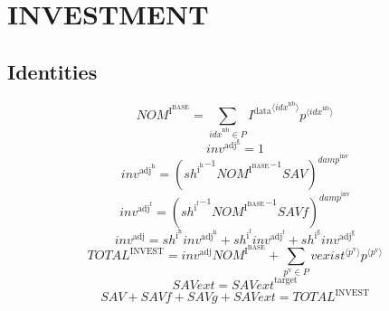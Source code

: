 \section{INVESTMENT}

\subsection{Identities}

\begin{equation}
{N\!O\!M}^{\mathrm{I}^{\mathrm{BASE}}} = \sum_{{i\!d\!x}^{\mathrm{nb}}\in P} {{I^{\mathrm{data}}}^{\langle {i\!d\!x}^{\mathrm{nb}}\rangle}} {{p}^{\langle {i\!d\!x}^{\mathrm{nb}}\rangle}}
\end{equation}
\begin{equation}
{i\!n\!v}^{\mathrm{adj}^{\mathrm{g}}} = 1
\end{equation}
\begin{equation}
{i\!n\!v}^{\mathrm{adj}^{\mathrm{h}}} = \left({{s\!h}^{\mathrm{i}^{\mathrm{h}}}}^{-1} {{N\!O\!M}^{\mathrm{I}^{\mathrm{BASE}}}}^{-1} {{S\!A\!V}}\right)^{{d\!a\!m\!p}^{\mathrm{inv}}}
\end{equation}
\begin{equation}
{i\!n\!v}^{\mathrm{adj}^{\mathrm{f}}} = \left({{s\!h}^{\mathrm{i}^{\mathrm{f}}}}^{-1} {{N\!O\!M}^{\mathrm{I}^{\mathrm{BASE}}}}^{-1} {{S\!A\!V\!f}}\right)^{{d\!a\!m\!p}^{\mathrm{inv}}}
\end{equation}
\begin{equation}
{i\!n\!v}^{\mathrm{adj}} = {{s\!h}^{\mathrm{i}^{\mathrm{h}}}} {{i\!n\!v}^{\mathrm{adj}^{\mathrm{h}}}} + {{s\!h}^{\mathrm{i}^{\mathrm{f}}}} {{i\!n\!v}^{\mathrm{adj}^{\mathrm{f}}}} + {{s\!h}^{\mathrm{i}^{\mathrm{g}}}} {{i\!n\!v}^{\mathrm{adj}^{\mathrm{g}}}}
\end{equation}
\begin{equation}
{T\!O\!T\!A\!L}^{\mathrm{INVEST}} = {{i\!n\!v}^{\mathrm{adj}}} {{N\!O\!M}^{\mathrm{I}^{\mathrm{BASE}}}} + \sum_{p^{\mathrm{v}}\in P} {{{v\!e\!x\!i\!s\!t}}^{\langle p^{\mathrm{v}}\rangle}} {{p}^{\langle p^{\mathrm{v}}\rangle}}
\end{equation}
\begin{equation}
{S\!A\!V\!e\!x\!t} = {S\!A\!V\!e\!x\!t}^{\mathrm{target}}
\end{equation}
\begin{equation}
{S\!A\!V} + {S\!A\!V\!f} + {S\!A\!V\!g} + {S\!A\!V\!e\!x\!t} = {T\!O\!T\!A\!L}^{\mathrm{INVEST}}
\end{equation}




